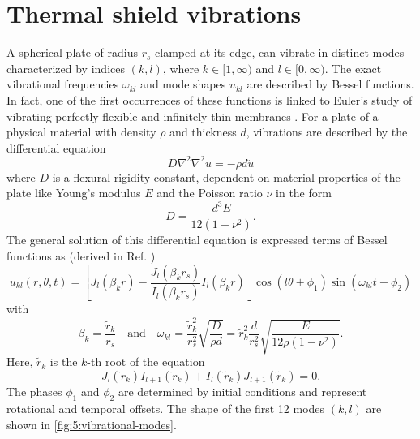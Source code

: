 \section{Thermal shield vibrations}\label{sec:5:thermal-vibrations}

A spherical plate of radius $r_s$ clamped at its edge, can vibrate in distinct modes characterized by indices $(k,l)$, where $k \in [1,\infty)$ and $l \in [0, \infty)$.
The exact vibrational frequencies $\omega_{kl}$ and mode shapes $u_{kl}$ are described by Bessel functions.
In fact, one of the first occurrences of these functions is linked to Euler's study of vibrating perfectly flexible and infinitely thin membranes \cite{Dutka_1995}.
For a plate of a physical material with density $\rho$ and thickness $d$, vibrations are described by the differential equation \cite[p. 490]{Rao_2019}
\begin{equation}
  D \nabla^2\nabla^2 u = -\rho d \ddot{u}
\end{equation} 
where $D$ is a flexural rigidity constant, dependent on material properties of the plate like Young's modulus $E$ and the Poisson ratio $\nu$ in the form
\begin{equation}
  D = \frac{d^3 E}{12(1-\nu^2)} .
\end{equation}
The general solution of this differential equation is expressed terms of Bessel functions as (derived in Ref. \cite[p. 490-495]{Rao_2019}) 
\begin{equation}
  u_{kl}(r, \theta, t) = \left[J_l(\beta_k r) - \frac{J_l(\beta_k r_s)}{I_l(\beta_k r_s)}I_l(\beta_k r)\right]\cos(l\theta+\phi_1)\sin(\omega_{kl}t+\phi_2)
\end{equation}
with
\begin{equation} \label{eq:5:vibration-frequency}
  \beta_k = \frac{\tilde{r}_k}{r_s} \quad \text{and} \quad \omega_{kl} = \frac{\tilde{r}_k^2}{r_s^2}\sqrt{\frac{D}{\rho d}} = \tilde{r}_k^2\frac{d}{r_s^2}\sqrt{\frac{E}{12\rho(1-\nu^2)}} .
\end{equation}
Here, $\tilde{r}_k$ is the $k$-th root of the equation
\begin{equation}\label{eq:5:bessel-zeros}
  J_l(\tilde{r}_k)I_{l+1}(\tilde{r}_k)+I_l(\tilde{r}_k)J_{l+1}(\tilde{r}_k) = 0 .
\end{equation}
The phases $\phi_1$ and $\phi_2$ 
are determined by initial conditions and represent rotational and temporal offsets.
The shape of the first 12 modes $(k,l)$ are shown in \cref{fig:5:vibrational-modes}.
